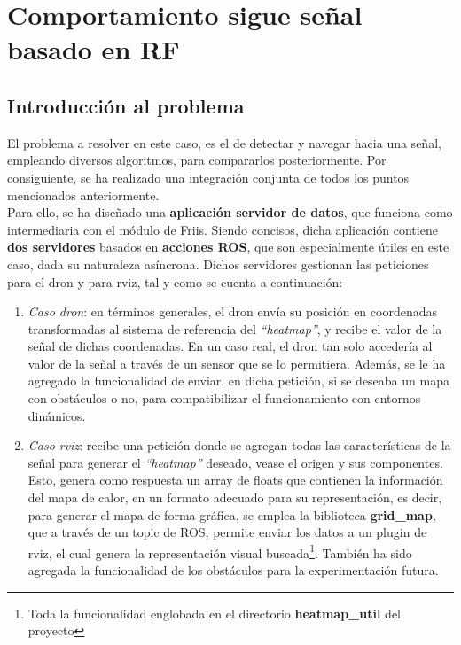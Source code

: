 
\section{Comportamiento sigue señal basado en \ac{RF}}
\label{sec:signal_follow}

\subsection{Introducción al problema}
\label{subsec:intro_sf}

El problema a resolver en este caso, es el de detectar y navegar hacia una señal, empleando diversos algoritmos, para compararlos posteriormente. Por consiguiente, se ha realizado una integración conjunta de todos los puntos mencionados anteriormente.\\

Para ello, se ha diseñado una \textbf{aplicación servidor de datos}, que funciona como intermediaria con el módulo de Friis. Siendo concisos, dicha aplicación contiene \textbf{dos servidores} basados en \textbf{acciones \ac{ROS}}, que son especialmente útiles en este caso, dada su naturaleza asíncrona. Dichos servidores gestionan las peticiones para el dron y para rviz, tal y como se cuenta a continuación:

\begin{enumerate}
	\item \emph{Caso dron}: en términos generales, el dron envía su posición en coordenadas transformadas al sistema de referencia del \emph{``heatmap''}, y recibe el valor de la señal de dichas coordenadas. En un caso real, el dron tan solo accedería al valor de la señal a través de un sensor que se lo permitiera. Además, se le ha agregado la funcionalidad de enviar, en dicha petición, si se deseaba un mapa con obstáculos o no, para compatibilizar el funcionamiento con entornos dinámicos.

	\item \emph{Caso rviz}: recibe una petición donde se agregan todas las características de la señal para generar el \emph{``heatmap''} deseado, vease el origen y sus componentes. Esto, genera como respuesta un array de floats que contienen la información del mapa de calor, en un formato adecuado para su representación, es decir, para generar el mapa de forma gráfica, se emplea la biblioteca \textbf{grid\_map}, que a través de un topic de \ac{ROS}, permite enviar los datos a un plugin de rviz, el cual genera la representación visual buscada\footnote[2]{Toda la funcionalidad englobada en el directorio \textbf{heatmap\_util} del proyecto}. También ha sido agregada la funcionalidad de los obstáculos para la experimentación futura.
\end{enumerate}

